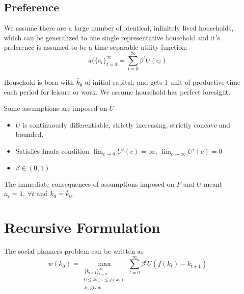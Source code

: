 \documentclass[twocolumn, fleqn]{article}
\begin{document}
	\subsection{Preference}
	
	We assume there are a large number of identical, infinitely lived households, which can be generalized to one single representative household and it's preference is assumed to be a time-separable utility function:
	\begin{equation*}
		u(\{c_t\}_{t=0}^{\infty} = \sum_{t=0}^{\infty} \beta^t U(c_t)
	\end{equation*}
	
	Household is born with $\bar{k}_0$ of initial capital; and gets 1 unit of productive time each period for leisure or work. We assume household has perfect foresight.
	
	Some assumptions are imposed on $U$
	\begin{itemize}
		\item $U$ is continuously differentiable, strictly increasing, strictly concave and bounded.
		\item Satisfies Inada condition $\lim_{c \rightarrow 0} U'(c)= \infty, \ \lim_{c \rightarrow \infty} U'(c) = 0$
		\item $\beta \in (0,1)$
	\end{itemize}
	
	The immediate consequences of assumptions imposed on $F$ and $U$ meant \(n_t =1, \ \forall t\) and \(k_0 =\bar{k}_0\).
	
	\section{Recursive Formulation}
	
	The social planners problem can be written as 
	\[
	w(k_0) = \max_{\substack{\{k_{t+1}\}_{t=0}^{\infty} \\ 0 \leq k_{t+1} \leq f(k_t) \\ k_0 \text{ given}}} \sum_{t=0}^{\infty} \beta^t U(f(k_t)-k_{t+1}) \tag{1}
	\]
	
\end{document}
